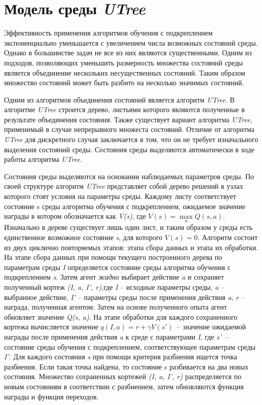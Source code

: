 \section{Модель среды \textit{UTree}}

Эффективность применения алгоритмов обучения с подкреплением экспоненциально уменьшается с увеличением числа возможных состояний среды. Однако в большинстве задач не все из них являются существенными. Одним из подходов, позволяющих уменьшить размерность множества состояний среды является объединение нескольких несущественных состояний. Таким образом множество состояний может быть разбито на несколько значимых состояний. 

Одним из алгоритмов объединения состояний является алгоритм \textit{UTree}. В алгоритме \textit{UTree} строится дерево, листьями которого являются полученные в результате объединения состояния. Также существует вариант алгоритма \textit{UTree}, применимый в случае непрерывного множеста состояний. Отличие от алгоритма \textit{UTree} для дискретного случая заключается в том, что он не требует изначального выделения состояний среды. Состояния среды выделяются автоматически в ходе работы алгоритма \textit{UTree}.

Состояния среды выделяются на основании наблюдаемых параметров среды. По своей структуре алгоритм \textit{UTree} представляет собой дерево решений в узлах которого стоят условия на параметры среды.
Каждому листу соответствует состояние s среды алгоритма обучения с подкреплением, ожидаемое значение награды в котором обозначается как \textit{V(s)}, где $V(s) = \max \limits_a Q(s,a)$. Изначально в дереве существует лишь один лист, и таким образом у среды есть единственное возможное состояние \textit{s}, для которого $V(s) = 0$. Алгоритм состоит из двух циклично повторяемых этапов: этапа сбора данных и этапа их обработки. На этапе сбора данных при помощи текущего построенного дерева по параметрам среды \textit{I} определяется состояние среды алгоритма обучения с подкреплением \textit{s}. Затем агент \textit{жадно} выбирает действие \textit{a} и сохраняет полученный кортеж \textit{(I, a, I', r)},где \textit{I} -- исходные параметры среды, \textit{a} -- выбранное действие, \textit{I'} -- параметры среды после применения действия \textit{a}, \textit{r} -- награда, полученная агентом. Затем на основе полученного опыта агент обновляет значение \textit{Q(s, a)}. На этапе обработки для каждого сохраненного кортежа вычисляется значение $q(I, a) =  r + \gamma V (s')$~-- значение ожидаемой награды после применения действия \textit{a} к среде с параметрами \textit{I}, где \textit{s'}~-- состояние среды обучения с подкреплением, соответствующее параметрам среды \textit{I'}. Для каждого состояния \textit{s} при помощи критерия разбиения ищется точка разбиения. Если такая точка найдена, то состояние s разбивается на два новых состояния. Множество сохраненных кортежей \textit{(I, a, I', r)} распределяется по новым состояниям в соответствии с разбиением, затем обновляются функция награды и функция переходов.

